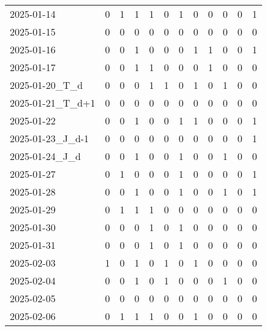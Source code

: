 \documentclass[dvipdfmx,oneside]{article}
\begin{document}
\begin{tabular}{lccccccccccc}
        2025-01-14 &     0 &     1 &     1 &     1 &     0 &     1 &     0 &     0 &     0 &     0 &     1 \\
        2025-01-15 &     0 &     0 &     0 &     0 &     0 &     0 &     0 &     0 &     0 &     0 &     0 \\
        2025-01-16 &     0 &     0 &     1 &     0 &     0 &     0 &     1 &     1 &     0 &     0 &     1 \\
        2025-01-17 &     0 &     0 &     1 &     1 &     0 &     0 &     0 &     1 &     0 &     0 &     0 \\
  2025-01-20\_T\_d &     0 &     0 &     0 &     1 &     1 &     0 &     1 &     0 &     1 &     0 &     0 \\
2025-01-21\_T\_d+1 &     0 &     0 &     0 &     0 &     0 &     0 &     0 &     0 &     0 &     0 &     0 \\
        2025-01-22 &     0 &     0 &     1 &     0 &     0 &     1 &     1 &     0 &     0 &     0 &     1 \\
2025-01-23\_J\_d-1 &     0 &     0 &     0 &     0 &     0 &     0 &     0 &     0 &     0 &     0 &     1 \\
  2025-01-24\_J\_d &     0 &     0 &     1 &     0 &     0 &     1 &     0 &     0 &     1 &     0 &     0 \\
        2025-01-27 &     0 &     1 &     0 &     0 &     0 &     1 &     0 &     0 &     0 &     0 &     1 \\
        2025-01-28 &     0 &     0 &     1 &     0 &     0 &     1 &     0 &     0 &     1 &     0 &     1 \\
        2025-01-29 &     0 &     1 &     1 &     1 &     0 &     0 &     0 &     0 &     0 &     0 &     0 \\
        2025-01-30 &     0 &     0 &     0 &     1 &     0 &     1 &     0 &     0 &     0 &     0 &     0 \\
        2025-01-31 &     0 &     0 &     0 &     1 &     0 &     1 &     0 &     0 &     0 &     0 &     0 \\
        2025-02-03 &     1 &     0 &     1 &     0 &     1 &     0 &     1 &     0 &     0 &     0 &     0 \\
        2025-02-04 &     0 &     0 &     1 &     0 &     1 &     0 &     0 &     0 &     1 &     0 &     0 \\
        2025-02-05 &     0 &     0 &     0 &     0 &     0 &     0 &     0 &     0 &     0 &     0 &     0 \\
        2025-02-06 &     0 &     1 &     1 &     1 &     0 &     0 &     1 &     0 &     0 &     0 &     0 \\

\end{tabular}
\end{document}
